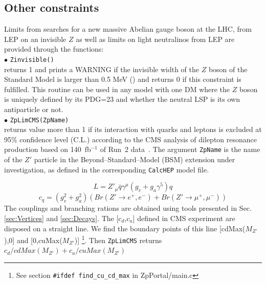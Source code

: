 \documentclass[12pt,a4paper]{article}
\newcommand{\tcb}[1]{{\color{blue} #1 }}
\begin{document}
\subsection{Other constraints}

Limits from searches for a new massive Abelian gauge boson at the LHC, from LEP on an invisible $Z$ as well as limits on light neutralinos from LEP are provided through the functions: \\[2mm]
%
\noi$\bullet$ \verb|Zinvisible()|\\
returns 1 and prints a WARNING if the invisible width of the $Z$ boson of the Standard Model 
is larger than 0.5 MeV (\cite{Freitas:2014hra}) and returns 0 if this constraint is fulfilled.
This routine can be used in any model with one DM where the $Z$ boson is  uniquely defined by its PDG=23 and whether the neutral LSP is its own antiparticle or not.\\[2mm]
%



\noi$\bullet$ \verb|ZpLimCMS(ZpName)|\\
returns value more than 1 if its interaction with quarks and leptons is excluded  at 95\%  confidence level (C.L.) according to the CMS analysis of dilepton resonance production based on 140~fb$^{-1}$ of Run~2 data~\cite{CMS:2021ctt}.  
The argument \texttt{ZpName} is the name of the $Z'$ particle in the Beyond--Standard--Model (BSM) extension under investigation, as defined in the corresponding \texttt{CalcHEP} model file.

\begin{equation}
L=  Z'_\mu \bar{q} \gamma^\mu(g_v+g_a\gamma^5) q
\end{equation}
\begin{equation}
  c_q=(g_v^2 + g_a^2) (Br(Z'\to e^+,e^-) + Br(Z'\to \mu^+,\mu^-))
\end{equation}
  The couplings and branching rations are  obtained using tools presented in Sec. \ref{sec:Vertices} and \ref{sec:Decays}. 
 The [$c_d$,$c_u$] defined in CMS experiment  are disposed on a straight line. We find the boundary points of this line 
[cdMax($M_{Z'}$),0] and [0,cuMax($M_{Z'}$)] \footnote{ See section  
{\tt \#ifdef find\_cu\_cd\_max} in  ZpPortal/main.c}. Then {\tt ZpLimCMS}
returns   $c_d/cdMax(M_{Z'})+c_u/cuMax(M_{Z'}) $
  
\end{document}
